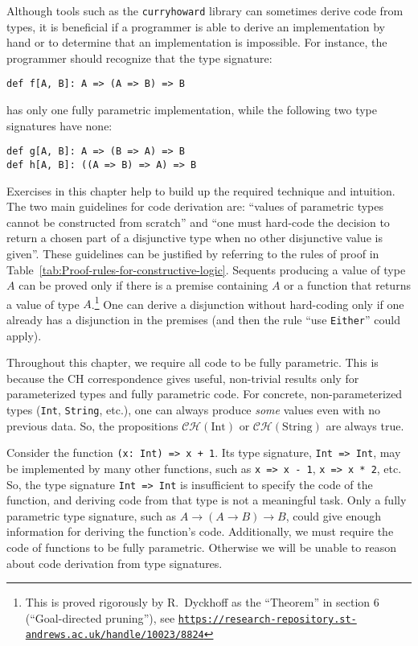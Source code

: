 Although tools such as the \lstinline!curryhoward! library can sometimes
derive code from types, it is beneficial if a programmer is able to
derive an implementation by hand or to determine that an implementation
is impossible. For instance, the programmer should recognize that
the type signature:
\begin{lstlisting}
def f[A, B]: A => (A => B) => B
\end{lstlisting}
has only one fully parametric implementation, while the following
two type signatures have none:
\begin{lstlisting}
def g[A, B]: A => (B => A) => B
def h[A, B]: ((A => B) => A) => B
\end{lstlisting}
Exercises in this chapter help to build up the required technique
and intuition. The two main guidelines for code derivation are: \textsf{``}values
of parametric types cannot be constructed from scratch\textsf{''} and \textsf{``}one
must hard-code the decision to return a chosen part of a disjunctive
type when no other disjunctive value is given\textsf{''}. These guidelines
can be justified by referring to the rules of proof in Table~\ref{tab:Proof-rules-for-constructive-logic}.
Sequents producing a value of type $A$ can be proved only if there
is a premise containing $A$ or a function that returns a value of
type $A$.\footnote{This is proved rigorously by R.~Dyckhoff as
the \textsf{``}Theorem\textsf{''} in section 6 (\textsf{``}Goal-directed pruning\textsf{''}), see
\texttt{\href{https://research-repository.st-andrews.ac.uk/handle/10023/8824}{https://research-repository.st-andrews.ac.uk/handle/10023/8824}}} One can derive a disjunction without hard-coding only if one already
has a disjunction in the premises (and then the rule \textsf{``}use \lstinline!Either!\textsf{''}
could apply).

Throughout this chapter, we require all code to be fully parametric.
This is because the CH correspondence gives useful, non-trivial results
only for parameterized types and fully parametric code. For concrete,
non-parameterized types (\lstinline!Int!, \lstinline!String!, etc.),
one can always produce \emph{some} values even with no previous data.
So, the propositions $\mathcal{CH}(\text{Int})$ or $\mathcal{CH}(\text{String})$
are always true.

Consider the function \lstinline!(x: Int) => x + 1!. Its type signature,
\lstinline!Int => Int!, may be implemented by many other functions,
such as \lstinline!x => x - 1!, \lstinline!x => x * 2!, etc. So,
the type signature \lstinline!Int => Int! is insufficient to specify
the code of the function, and deriving code from that type is not
a meaningful task. Only a fully parametric type signature, such as
$A\rightarrow\left(A\rightarrow B\right)\rightarrow B$, could give
enough information for deriving the function\textsf{'}s code. Additionally,
we must require the code of functions to be fully parametric. Otherwise
we will be unable to reason about code derivation from type signatures.

